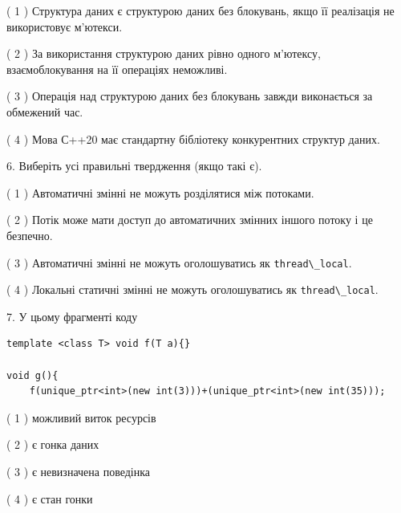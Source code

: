\documentclass[12pt, ukrainian]{article}
\def\code#1{\Verb!#1!}
\begin{document}
\begin {large}
{( 1 ) Структура даних є структурою даних без блокувань, якщо її реалізація не використовує м’ютекси.%

( 2 ) За використання структурою даних рівно одного м’ютексу, взаємоблокування на її операціях неможливі.%

( 3 ) Операція над структурою даних без блокувань завжди виконається за обмежений час.%

( 4 ) Мова С++20 має стандартну бібліотеку конкурентних структур даних.%
\newpage



\vspace{5mm}
6. Виберіть усі правильні твердження (якщо такі є).\par
\vspace{2mm}

( 1 ) Автоматичні змінні не можуть розділятися між потоками.%

( 2 ) Потік може мати доступ до автоматичних змінних іншого потоку і це безпечно.%

( 3 ) Автоматичні змінні не можуть оголошуватись як \code{thread\_local}.%

( 4 ) Локальні статичні змінні не можуть оголошуватись як \code{thread\_local}.%


\vspace{5mm}
7. У цьому фрагменті коду
\begin{verbatim}
template <class T> void f(T a){}

void g(){
    f(unique_ptr<int>(new int(3)))+(unique_ptr<int>(new int(35)));
\end{verbatim}

( 1 ) можливий виток ресурсів%

( 2 ) є гонка даних%

( 3 ) є невизначена поведінка%

( 4 ) є стан гонки%
}
\end {large}
\end{document}
